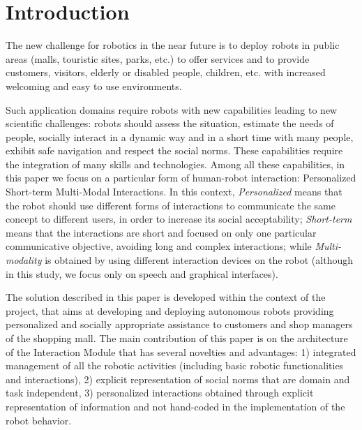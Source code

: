 \section{Introduction}


The new challenge for robotics in the near future is to deploy robots in public areas (malls, touristic sites, parks, etc.) to offer services and to provide customers, visitors, elderly or disabled people, children, etc.  with increased welcoming and easy to use environments. 

Such application domains require robots with new capabilities leading to new scientific challenges: robots should assess the situation, estimate the needs of people, socially interact in a dynamic way and in a short time with many people, exhibit safe navigation and respect the social norms. These capabilities require the integration of many skills and technologies.
Among all these capabilities, in this paper we focus on a particular form of human-robot interaction:
Personalized Short-term Multi-Modal Interactions.
In this context, \emph{Personalized} means that the robot should use different forms of interactions to communicate the same concept to different users, in order to increase its social acceptability;
\emph{Short-term} means that the interactions are short and focused on only one particular communicative objective, avoiding long and complex interactions; while
\emph{Multi-modality} is obtained by using different interaction devices on the robot (although in this study, we focus only on speech and graphical interfaces).

The solution described in this paper is developed within the context of the \coaches  project, that aims at developing and deploying autonomous robots providing personalized and socially appropriate assistance to customers and shop managers of the shopping mall.
The main contribution of this paper is on the architecture of the Interaction Module that has several novelties and advantages: 1) integrated management of all the robotic activities (including basic robotic functionalities and interactions), 2) explicit representation of social norms that are domain and task independent, 3) personalized interactions obtained through explicit representation of information and not hand-coded in the implementation of the robot behavior.


